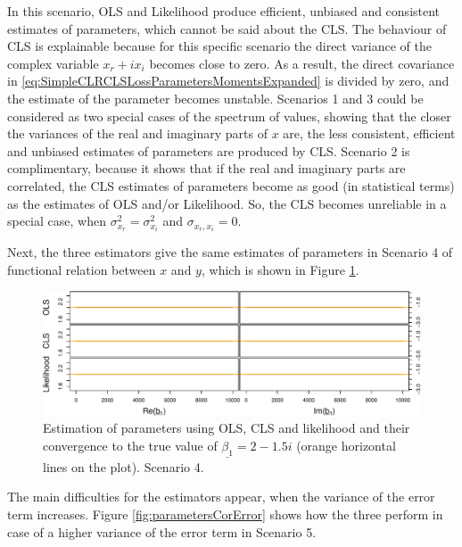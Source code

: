 \documentclass[
]{book}
\begin{document}
In this scenario, OLS and Likelihood produce efficient, unbiased and consistent estimates of parameters, which cannot be said about the CLS. The behaviour of CLS is explainable because for this specific scenario the direct variance of the complex variable \(x_r + i x_i\) becomes close to zero. As a result, the direct covariance in \eqref{eq:SimpleCLRCLSLossParametersMomentsExpanded} is divided by zero, and the estimate of the parameter becomes unstable. Scenarios 1 and 3 could be considered as two special cases of the spectrum of values, showing that the closer the variances of the real and imaginary parts of \(x\) are, the less consistent, efficient and unbiased estimates of parameters are produced by CLS. Scenario 2 is complimentary, because it shows that if the real and imaginary parts are correlated, the CLS estimates of parameters become as good (in statistical terms) as the estimates of OLS and/or Likelihood. So, the CLS becomes unreliable in a special case, when \(\sigma_{x_r}^2 = \sigma_{x_i}^2\) and \(\sigma_{x_r,x_i}=0\).

Next, the three estimators give the same estimates of parameters in Scenario 4 of functional relation between \(x\) and \(y\), which is shown in Figure \ref{fig:parametersFR}.

\begin{figure}
\centering
\includegraphics{Svetunkov---Svetunkov---Complex-Valued-Econometrics_files/figure-latex/parametersFR-1.pdf}
\caption{\label{fig:parametersFR}Estimation of parameters using OLS, CLS and likelihood and their convergence to the true value of \(\underline{\beta_1}=2-1.5i\) (orange horizontal lines on the plot). Scenario 4.}
\end{figure}

The main difficulties for the estimators appear, when the variance of the error term increases. Figure \ref{fig:parametersCorError} shows how the three perform in case of a higher variance of the error term in Scenario 5.
\end{document}
